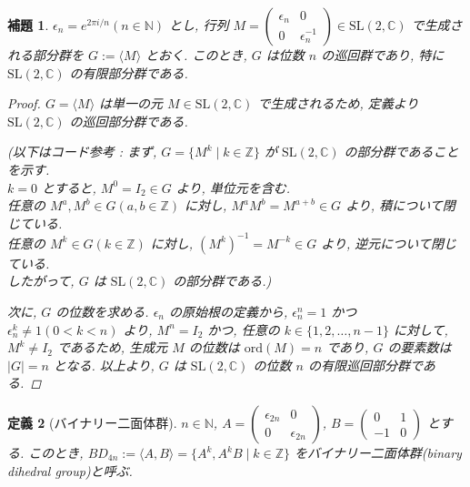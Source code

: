 \documentclass[xelatex,a4paper,ja=standard]{bxjsreport}
\newtheorem{definition}{定義}%
\newtheorem{lemma}[definition]{補題}%
\begin{document}
\begin{lemma}
    \(\epsilon_n = e^{2\pi i/n} (n \in \mathbb{N})\) とし, 行列 \(M = \begin{pmatrix} \epsilon_n & 0 \\ 0 & \epsilon_n^{-1} \end{pmatrix} \in \mathrm{SL}(2, \mathbb{C})\)
    で生成される部分群を \(G := \langle M \rangle\) とおく.
    このとき, \(G\) は位数 \(n\) の巡回群であり, 特に \(\mathrm{SL}(2, \mathbb{C})\) の有限部分群である.

    \begin{proof}
        \(G = \langle M \rangle\) は単一の元 \(M \in \mathrm{SL}(2, \mathbb{C})\) で生成されるため, 定義より \(\mathrm{SL}(2, \mathbb{C})\) の巡回部分群である.

        (以下はコード参考 :
        まず, \(G = \{M^k \mid k \in \mathbb{Z}\}\) が \(\mathrm{SL}(2, \mathbb{C})\) の部分群であることを示す. \\
        \(k = 0\) とすると, \(M^0 = I_2 \in G\) より, 単位元を含む. \\
        任意の \(M^a, M^b \in G (a, b \in \mathbb{Z})\) に対し, \(M^a M^b = M^{a+b} \in G\) より, 積について閉じている. \\
        任意の \(M^k \in G (k \in \mathbb{Z})\) に対し, \((M^k)^{-1} = M^{-k} \in G\) より, 逆元について閉じている. \\
        したがって, \(G\) は \(\mathrm{SL}(2, \mathbb{C})\) の部分群である.)

        次に, \(G\) の位数を求める.
        \(\epsilon_n\) の原始根の定義から, \(\epsilon_n^n = 1\) かつ \(\epsilon_n^k \neq 1 (0 < k < n)\) より,
        \(M^n = I_2\) かつ, 任意の \(k \in \{1, 2, \dots, n-1\}\) に対して, \(M^k \neq I_2\) であるため,
        生成元 \(M\) の位数は \(\mathrm{ord}(M) = n\) であり, \(G\) の要素数は \(|G| = n\) となる.
        以上より, \(G\) は \(\mathrm{SL}(2, \mathbb{C})\) の位数 \(n\) の有限巡回部分群である.
    \end{proof}
\end{lemma}


\begin{definition}[バイナリー二面体群]
    \(n \in \mathbb{N}\), \(A = \begin{pmatrix} \epsilon_{2n} & 0 \\ 0 & \epsilon_{2n} \end{pmatrix}\),
    \(B = \begin{pmatrix} 0 & 1 \\ -1 & 0 \end{pmatrix}\) とする.
    このとき, \(BD_{4n} := \langle A, B \rangle = \{A^k, A^k B \mid k \in \mathbb{Z}\}\)
    をバイナリー二面体群(binary dihedral group)と呼ぶ.
\end{definition}
\end{document}
